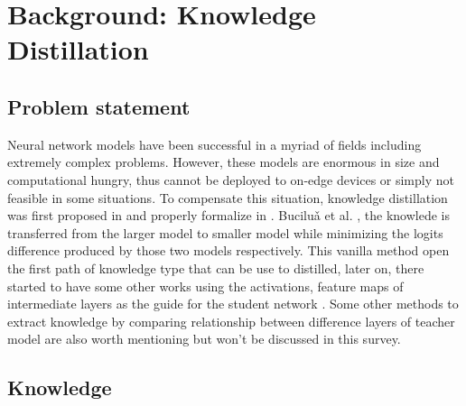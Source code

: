 \section{Background: Knowledge Distillation}

\subsection{Problem statement}
Neural network models have been successful in a myriad of fields including extremely complex problems. However, these models are enormous in size and computational hungry, thus cannot be deployed to on-edge devices or simply not feasible in some situations. To compensate this situation, knowledge distillation was first proposed in \cite{firstkdpaper} and properly formalize in \cite{hintonfirstkd}. Buciluǎ et al. \cite{firstkdpaper}, the knowlede is transferred from the larger model to smaller model while minimizing the logits difference produced by those two models respectively. This vanilla method open the first path of knowledge type that can be use to distilled, later on, there started to have some other works using the activations, feature maps of intermediate layers as the guide for the student network \cite{featurebased01, featurebased02_AT,featurebased03_relu}. Some other methods to extract knowledge by comparing relationship between difference layers of teacher model \cite{relbase01, relbase02} are also worth mentioning but won't be discussed in this survey.

\subsection{Knowledge}
